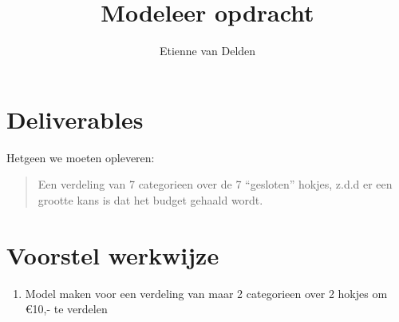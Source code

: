 \documentclass[a4paper, twosided, article]{memoir}
\title{Modeleer opdracht}
\author{Etienne van Delden}
\begin{document}
\maketitle
\tableofcontents

\chapter{Deliverables}
Hetgeen we moeten opleveren: 
\begin{quote}
  Een verdeling van 7 categorieen over de 7 ``gesloten'' hokjes, z.d.d er een grootte kans is dat het budget gehaald wordt.
\end{quote}

\chapter{Voorstel werkwijze}

  \begin{enumerate}
    \item Model maken voor een verdeling van maar 2 categorieen over 2 hokjes om €10,- te verdelen
  \end{enumerate}
\end{document}
